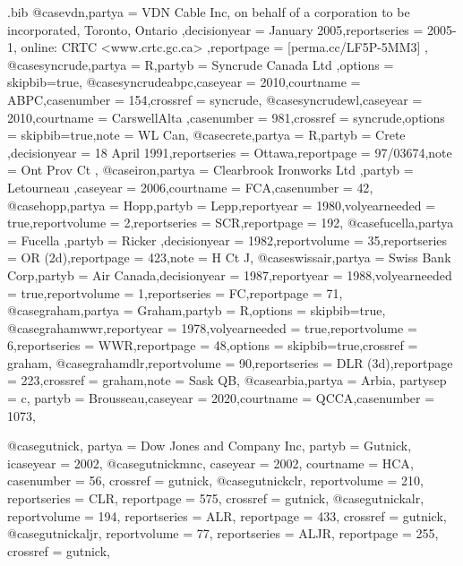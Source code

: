 \begin{filecontents*}{\jobname.bib}
@case{vdn,partya = {VDN Cable Inc, on behalf of a corporation to be incorporated, Toronto, Ontario },decisionyear = {January 2005},reportseries = {2005-1, online: CRTC <www.crtc.gc.ca> },reportpage = {[perma.cc/LF5P-5MM3] },}
@case{syncrude,partya = {R},partyb = {Syncrude Canada Ltd },options = {skipbib=true},}
@case{syncrudeabpc,caseyear = {2010},courtname = {ABPC},casenumber = {154},crossref = {syncrude},}
@case{syncrudewl,caseyear = {2010},courtname = {CarswellAlta },casenumber = {981},crossref = {syncrude},options = {skipbib=true},note = {WL Can},}
@case{crete,partya = {R},partyb = {Crete },decisionyear = {18 April 1991},reportseries = {Ottawa},reportpage = {97/03674},note = {Ont Prov Ct },}
@case{iron,partya = {Clearbrook Ironworks Ltd },partyb = {Letourneau },caseyear = {2006},courtname = {FCA},casenumber = {42},}
@case{hopp,partya = {Hopp},partyb = {Lepp},reportyear = {1980},volyearneeded = {true},reportvolume = {2},reportseries = {SCR},reportpage = {192},}
@case{fucella,partya = {Fucella },partyb = {Ricker },decisionyear = {1982},reportvolume = {35},reportseries = {OR (2d)},reportpage = {423},note = {H Ct J},}
@case{swissair,partya = {Swiss Bank Corp},partyb = {Air Canada},decisionyear = {1987},reportyear = {1988},volyearneeded = {true},reportvolume = {1},reportseries = {FC},reportpage = {71},}
@case{graham,partya = {Graham},partyb = {R},options = {skipbib=true},}
@case{grahamwwr,reportyear = {1978},volyearneeded = {true},reportvolume = {6},reportseries = {WWR},reportpage = {48},options = {skipbib=true},crossref = {graham},}
@case{grahamdlr,reportvolume = {90},reportseries = {DLR (3d)},reportpage = {223},crossref = {graham},note = {Sask QB},}
@case{arbia,partya = {Arbia},
partysep = {c},
partyb = {Brousseau},caseyear = {2020},courtname = {QCCA},casenumber = {1073},}








@case{gutnick,
  partya = {Dow Jones and Company Inc}, 
  partyb = {Gutnick},
  icaseyear = {2002},
  }
@case{gutnickmnc,
  caseyear = {2002},
  courtname = {HCA},
  casenumber = {56},
  crossref = {gutnick},
  }
@case{gutnickclr,
  reportvolume = {210},
  reportseries = {CLR},
  reportpage = {575},
  crossref = {gutnick},
  	}
@case{gutnickalr,
  reportvolume = {194},
  reportseries = {ALR},
  reportpage = {433},
  crossref = {gutnick},
  	}
@case{gutnickaljr,
  reportvolume = {77},
  reportseries = {ALJR},
  reportpage = {255},
  crossref = {gutnick},
  	}





\end{filecontents*}
